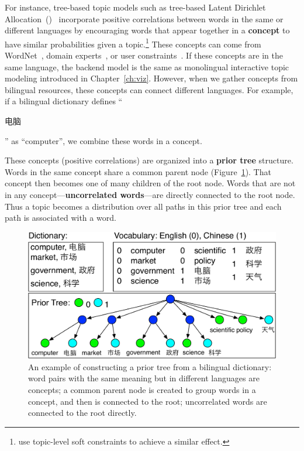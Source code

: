 For instance, tree-based topic models such as tree-based Latent Dirichlet 
Allocation~()~\citep{boyd-graber-07,andrzejewski-09,hu-14:itm}
incorporate positive correlations between words in the same or
different languages by encouraging words that appear together in a
{\bf concept} to have similar probabilities given a
topic.\footnote{\citet{Zhang-10} use
  topic-level soft constraints to achieve a similar effect.} These
concepts can come from WordNet~\citep{boyd-graber-10}, domain
experts~\citep{andrzejewski-09}, or user
constraints~\citep{hu-14:itm}. If these concepts are in the same
language, the backend model is the same as monolingual interactive topic modeling
introduced in Chapter~\ref{ch:viz}. However, when we gather concepts
from bilingual resources, these concepts can connect different
languages. For example, if a bilingual dictionary defines
``\begin{CJK*}{UTF8}{gbsn}电脑\end{CJK*}'' as ``computer'', we combine
  these words in a concept.

  These concepts (positive correlations) are organized into a {\bf
    prior tree} structure. Words in the same concept share a common
  parent node (Figure~\ref{fig:prior_trees}). That concept then
  becomes one of many children of the root node.  Words that are not
  in any concept---{\bf uncorrelated words}---are directly connected
  to the root node. Thus a topic becomes a distribution over all paths
  in this prior tree and each path is associated with a word.

\begin{figure}
\centering
\includegraphics[width=0.9\linewidth]{figures/correlations_tree-crop.pdf}
\vspace{-3mm}
\caption[Constructing prior tree from a bilingual dictionary]{An example of constructing a prior tree from a
  bilingual dictionary: word pairs with the same meaning but in
  different languages are concepts; a common parent node is created to
  group words in a concept, and then is connected to the root;
  uncorrelated words are connected to the root directly.}
\label{fig:prior_trees}
\end{figure}

